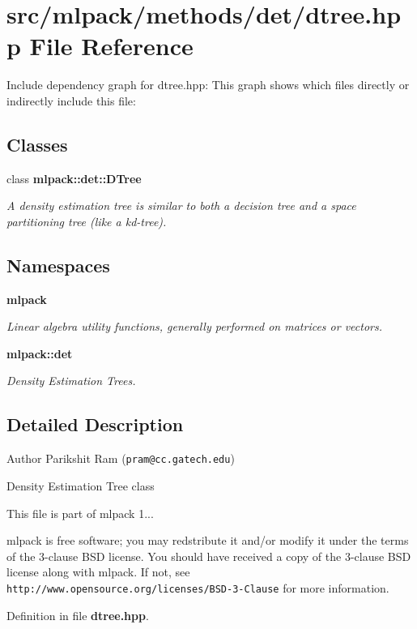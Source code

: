 \section{src/mlpack/methods/det/dtree.hpp File Reference}
\label{dtree_8hpp}
Include dependency graph for dtree.\-hpp\-:
This graph shows which files directly or indirectly include this file\-:
\subsection*{Classes}
\begin{DoxyCompactItemize}
\item 
class {\bf mlpack\-::det\-::\-D\-Tree}
\begin{DoxyCompactList}\small\item\em A density estimation tree is similar to both a decision tree and a space partitioning tree (like a kd-\/tree). \end{DoxyCompactList}\end{DoxyCompactItemize}
\subsection*{Namespaces}
\begin{DoxyCompactItemize}
\item 
{\bf mlpack}
\begin{DoxyCompactList}\small\item\em Linear algebra utility functions, generally performed on matrices or vectors. \end{DoxyCompactList}\item 
{\bf mlpack\-::det}
\begin{DoxyCompactList}\small\item\em Density Estimation Trees. \end{DoxyCompactList}\end{DoxyCompactItemize}


\subsection{Detailed Description}
\begin{DoxyAuthor}{Author}
Parikshit Ram ({\tt pram@cc.\-gatech.\-edu})
\end{DoxyAuthor}
Density Estimation Tree class

This file is part of mlpack 1...

mlpack is free software; you may redstribute it and/or modify it under the terms of the 3-\/clause B\-S\-D license. You should have received a copy of the 3-\/clause B\-S\-D license along with mlpack. If not, see {\tt http\-://www.\-opensource.\-org/licenses/\-B\-S\-D-\/3-\/\-Clause} for more information. 

Definition in file {\bf dtree.\-hpp}.


